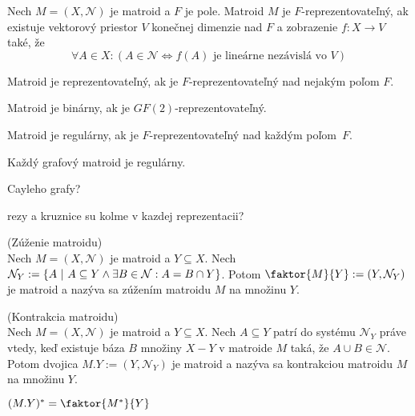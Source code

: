 \begin{definition}
Nech $M=(X, \mathcal{N})$ je matroid a $F$ je pole. Matroid $M$ je $F$-reprezentovateľný, ak
existuje vektorový priestor $V$ konečnej dimenzie nad $F$ a zobrazenie $f:X \to V$ také, že
$$\forall A \in X: \left(A \in \mathcal{N} \Longleftrightarrow f(A) \text{ je lineárne nezávislá vo } V \right)$$ 
\end{definition}

\begin{definition}
Matroid je reprezentovateľný, ak je $F$-reprezentovateľný nad nejakým poľom $F$.
\end{definition}

\begin{definition}
Matroid je binárny, ak je $GF(2)$-reprezentovateľný.
\end{definition}

\begin{definition}
Matroid je regulárny, ak je $F$-reprezentovateľný nad každým poľom~$F$.
\end{definition}

\begin{theorem_hard}
Každý grafový matroid je regulárny.
\end{theorem_hard}

\TODO Cayleho grafy?

\TODO rezy a kruznice su kolme v kazdej reprezentacii?

\begin{definition}{(Zúženie matroidu)}\\
Nech $M = (X, \mathcal{N})$ je matroid a $Y \subseteq X$. 
Nech $\mathcal{N}_Y := \left\{A ~|~ A \subseteq Y \wedge \exists B \in \mathcal{N}: A = B \cap Y\right\}$.
Potom $\faktor{M}{Y} := (Y, \mathcal{N}_Y)$ je matroid a nazýva sa zúžením matroidu $M$ na množinu $Y$.
\end{definition}

\begin{definition}{(Kontrakcia matroidu)}\\
Nech $M = (X, \mathcal{N})$ je matroid a $Y \subseteq X$. 
Nech $A \subseteq Y$ patrí do systému $\mathcal{N}_Y$ práve vtedy, keď existuje 
báza $B$ množiny $X-Y$ v matroide $M$ taká, že $A \cup B \in \mathcal{N}$. Potom dvojica
$M.Y := (Y, \mathcal{N}_Y)$ je matroid a nazýva sa kontrakciou matroidu $M$ na množinu $Y$.
\end{definition}

\begin{theorem}
$(M.Y)^* = \faktor{M^*}{Y}$
\end{theorem}

